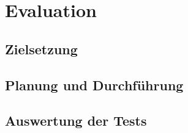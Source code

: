 \chapter{Evaluation}\label{sec:test}
\section{Zielsetzung}
\section{Planung und Durchführung}
\section{Auswertung der Tests}



